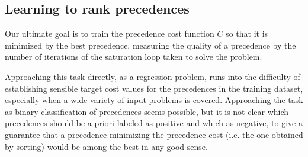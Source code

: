 

\subsection{Learning to rank precedences}
\label{sec:ranking}

Our ultimate goal is to train the precedence cost function $C$ so that it is minimized by the best precedence,
measuring the quality of a precedence by the number of iterations of the saturation loop taken to solve the problem.

Approaching this task directly, as a regression problem,
runs into the difficulty of establishing sensible target cost values for the precedences in the training dataset,
especially when a wide variety of input problems is covered.
Approaching the task as binary classification of precedences
seems possible, but it is not clear which precedences should be a priori
labeled as positive and which as negative, to give a guarantee
that a precedence minimizing the precedence cost (i.e. the one obtained by sorting)
would be among the best in any good sense.

